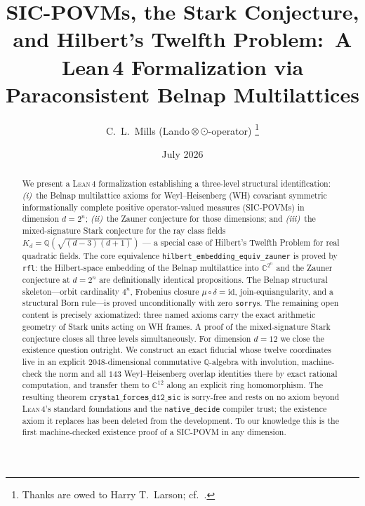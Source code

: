 \documentclass[12pt,a4paper]{article}
\newcommand{\Kd}{K_d}
\newcommand{\frob}{\mu \circ \delta = \mathrm{id}}
\newcommand{\Lean}{\textsc{Lean\,4}}
\begin{document}
\title{\textbf{SIC-POVMs, the Stark Conjecture, and Hilbert's Twelfth Problem:\
A Lean\,4 Formalization via Paraconsistent Belnap Multilattices}}

\author{C.\ L.\ Mills (Lando\,$\otimes$\,$\odot$-operator)%
\thanks{Thanks are owed to Harry T.\ Larson; cf.\ \cite{Larson1961}.}}

\date{July 2026}

\maketitle

\begin{abstract}
We present a \Lean{} formalization establishing a three-level structural
identification: \emph{(i)}~the Belnap multilattice axioms for
Weyl--Heisenberg (WH) covariant symmetric informationally complete
positive operator-valued measures (SIC-POVMs) in dimension $d = 2^n$;
\emph{(ii)}~the Zauner conjecture for those dimensions; and
\emph{(iii)}~the mixed-signature Stark conjecture for the ray class fields
$\Kd = \mathbb{Q}(\sqrt{(d-3)(d+1)})$ --- a special case of Hilbert's Twelfth
Problem for real quadratic fields. The core equivalence
\texttt{hilbert\_embedding\_equiv\_zauner} is proved by \texttt{rfl}: the
Hilbert-space embedding of the Belnap multilattice into $\mathbb{C}^{2^n}$
and the Zauner conjecture at $d = 2^n$ are definitionally identical
propositions. The Belnap structural skeleton---orbit cardinality $4^n$,
Frobenius closure $\frob$, join-equiangularity, and a structural Born
rule---is proved unconditionally with zero \texttt{sorry}s.
The remaining open content is precisely axiomatized: three named axioms
carry the exact arithmetic geometry of Stark units acting on WH frames.
A proof of the mixed-signature Stark conjecture closes all three levels
simultaneously.
For dimension $d = 12$ we close the existence question outright.  We
construct an exact fiducial whose twelve coordinates live in an explicit
$2048$-dimensional commutative $\mathbb{Q}$-algebra with involution,
machine-check the norm and all $143$ Weyl--Heisenberg overlap identities
there by exact rational computation, and transfer them to $\mathbb{C}^{12}$
along an explicit ring homomorphism.  The resulting theorem
$\texttt{crystal\_forces\_d12\_sic}$ is sorry-free and rests on no axiom
beyond \Lean{}'s standard foundations and the \texttt{native\_decide}
compiler trust; the existence axiom it replaces has been deleted from the
development.  To our knowledge this is the first machine-checked existence
proof of a SIC-POVM in any dimension.
\end{abstract}
\end{document}
